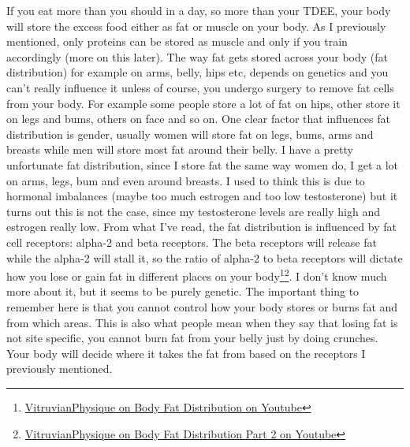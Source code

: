 \documentclass[openany, 12pt]{book}
\begin{document}
	If you eat more than you should in a day, so more than your TDEE, your body will store the excess food either as fat or muscle on your body. As I previously mentioned, only
	proteins can be stored as muscle and only if you train accordingly (more on this later). The way fat gets stored across your body (fat distribution) for example on arms, belly,
	hips etc, depends on genetics and you can't really influence it unless of course, you undergo surgery to remove fat cells from your body. For example some people store a lot of
	fat on hips, other store it on legs and bums, others on face and so on. One clear factor that influences fat distribution is gender, usually women will store fat on legs, bums,
	arms and breasts while men will store most fat around their belly. I have a pretty unfortunate fat distribution, since I store fat the same way women do, I get a lot on arms,
	legs, bum and even around breasts. I used to think this is due to hormonal imbalances (maybe too much estrogen and too low testosterone) but it turns out this is not the case,
	since my testosterone levels are really high and estrogen really low. From what I've read, the fat distribution is influenced by fat cell receptors: alpha-2 and beta receptors.
	The beta receptors will release fat while the alpha-2 will stall it, so the ratio of alpha-2 to beta receptors will dictate how you lose or gain fat in different places on your
	body\footnote{\href{https://www.youtube.com/watch?v=GbqN2sj8XyY}{VitruvianPhysique on Body Fat Distribution on Youtube}}\footnote{\href{https://www.youtube.com/watch?v=X_GeSVbAU3U}{VitruvianPhysique on Body Fat Distribution Part 2 on Youtube}}. 
	I don't know much more about it, but it seems to be purely genetic. The important thing to remember here is that you cannot control how your body stores or burns fat and from
	which areas. This is also what people mean when they say that losing fat is not site specific, you cannot burn fat from your belly just by doing crunches. Your body will decide
	where it takes the fat from based on the receptors I previously mentioned.
	
\end{document}
